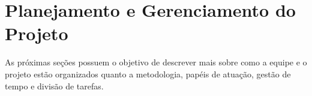 \chapter{Planejamento e Gerenciamento do Projeto}
As próximas seções possuem o objetivo de descrever mais sobre como a equipe e o projeto estão organizados quanto a metodologia, papéis de atuação, gestão de tempo e divisão de tarefas.







